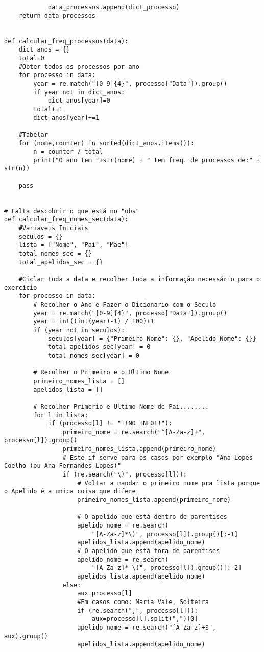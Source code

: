 \documentclass[11pt,a4paper]{report}%
\begin{document}
\begin{verbatim}
            data_processos.append(dict_processo)
    return data_processos


def calcular_freq_processos(data):
    dict_anos = {}
    total=0
    #Obter todos os processos por ano
    for processo in data:
        year = re.match("[0-9]{4}", processo["Data"]).group()
        if year not in dict_anos:
            dict_anos[year]=0
        total+=1
        dict_anos[year]+=1
    
    #Tabelar
    for (nome,counter) in sorted(dict_anos.items()):
        n = counter / total
        print("O ano tem "+str(nome) + " tem freq. de processos de:" + str(n))
    
    pass


# Falta descobrir o que está no "obs"
def calcular_freq_nomes_sec(data):
    #Variaveis Iniciais
    seculos = {}
    lista = ["Nome", "Pai", "Mae"]
    total_nomes_sec = {}
    total_apelidos_sec = {}

    #Ciclar toda a data e recolher toda a informação necessário para o exercício
    for processo in data:
        # Recolher o Ano e Fazer o Dicionario com o Seculo
        year = re.match("[0-9]{4}", processo["Data"]).group()
        year = int((int(year)-1) / 100)+1
        if (year not in seculos):
            seculos[year] = {"Primeiro_Nome": {}, "Apelido_Nome": {}}
            total_apelidos_sec[year] = 0
            total_nomes_sec[year] = 0

        # Recolher o Primeiro e o Ultimo Nome
        primeiro_nomes_lista = []
        apelidos_lista = []

        # Recolher Primerio e Ultimo Nome de Pai........
        for l in lista:
            if (processo[l] != "!!NO INFO!!"):
                primeiro_nome = re.search("^[A-Za-z]+", processo[l]).group()
                primeiro_nomes_lista.append(primeiro_nome)
                # Este if serve para os casos por exemplo "Ana Lopes Coelho (ou Ana Fernandes Lopes)"
                if (re.search("\)", processo[l])):
                    # Voltar a mandar o primeiro nome pra lista porque o Apelido é a unica coisa que difere
                    primeiro_nomes_lista.append(primeiro_nome)

                    # O apelido que está dentro de parentises
                    apelido_nome = re.search(
                        "[A-Za-z]*\)", processo[l]).group()[:-1]
                    apelidos_lista.append(apelido_nome)
                    # O apelido que está fora de parentises
                    apelido_nome = re.search(
                        "[A-Za-z]* \(", processo[l]).group()[:-2]
                    apelidos_lista.append(apelido_nome)
                else:
                    aux=processo[l]
                    #Em casos como: Maria Vale, Solteira
                    if (re.search(",", processo[l])):
                        aux=processo[l].split(",")[0]
                    apelido_nome = re.search("[A-Za-z]+$", aux).group()
                    apelidos_lista.append(apelido_nome)


\end{verbatim}
\end{document}
